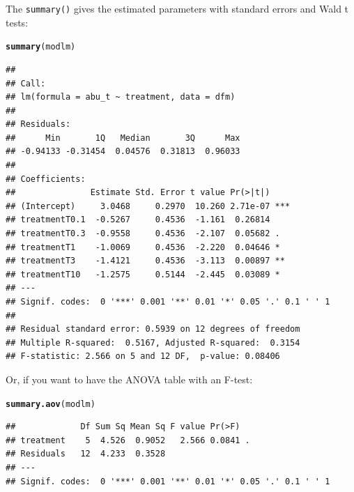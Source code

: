 \documentclass{scrartcl}\usepackage[]{graphicx}\usepackage[]{color}
\makeatletter
\newcommand{\hlstd}[1]{\textcolor[rgb]{0.345,0.345,0.345}{#1}}%
\newcommand{\hlkwd}[1]{\textcolor[rgb]{0.737,0.353,0.396}{\textbf{#1}}}%
\newenvironment{kframe}{%
 \def\at@end@of@kframe{}%
 \ifinner\ifhmode%
  \def\at@end@of@kframe{\end{minipage}}%
  \begin{minipage}{\columnwidth}%
 \fi\fi%
 \def\FrameCommand##1{\hskip\@totalleftmargin \hskip-\fboxsep
 \colorbox{shadecolor}{##1}\hskip-\fboxsep
     \hskip-\linewidth \hskip-\@totalleftmargin \hskip\columnwidth}%
 \MakeFramed {\advance\hsize-\width
   \@totalleftmargin\z@ \linewidth\hsize
   \@setminipage}}%
 {\par\unskip\endMakeFramed%
 \at@end@of@kframe}
\newenvironment{knitrout}{}{} %
\makeatother
\begin{document}
The \texttt{summary()} gives the estimated parameters with standard errors and Wald t tests:
\begin{knitrout}
\color{fgcolor}\begin{kframe}
\begin{alltt}
\hlkwd{summary}\hlstd{(modlm)}
\end{alltt}
\begin{verbatim}
## 
## Call:
## lm(formula = abu_t ~ treatment, data = dfm)
## 
## Residuals:
##      Min       1Q   Median       3Q      Max 
## -0.94133 -0.31454  0.04576  0.31813  0.96033 
## 
## Coefficients:
##               Estimate Std. Error t value Pr(>|t|)    
## (Intercept)     3.0468     0.2970  10.260 2.71e-07 ***
## treatmentT0.1  -0.5267     0.4536  -1.161  0.26814    
## treatmentT0.3  -0.9558     0.4536  -2.107  0.05682 .  
## treatmentT1    -1.0069     0.4536  -2.220  0.04646 *  
## treatmentT3    -1.4121     0.4536  -3.113  0.00897 ** 
## treatmentT10   -1.2575     0.5144  -2.445  0.03089 *  
## ---
## Signif. codes:  0 '***' 0.001 '**' 0.01 '*' 0.05 '.' 0.1 ' ' 1
## 
## Residual standard error: 0.5939 on 12 degrees of freedom
## Multiple R-squared:  0.5167,	Adjusted R-squared:  0.3154 
## F-statistic: 2.566 on 5 and 12 DF,  p-value: 0.08406
\end{verbatim}
\end{kframe}
\end{knitrout}

Or, if you want to have the ANOVA table with an F-test:
\begin{knitrout}
\color{fgcolor}\begin{kframe}
\begin{alltt}
\hlkwd{summary.aov}\hlstd{(modlm)}
\end{alltt}
\begin{verbatim}
##             Df Sum Sq Mean Sq F value Pr(>F)  
## treatment    5  4.526  0.9052   2.566 0.0841 .
## Residuals   12  4.233  0.3528                 
## ---
## Signif. codes:  0 '***' 0.001 '**' 0.01 '*' 0.05 '.' 0.1 ' ' 1
\end{verbatim}
\end{kframe}
\end{knitrout}
\end{document}
